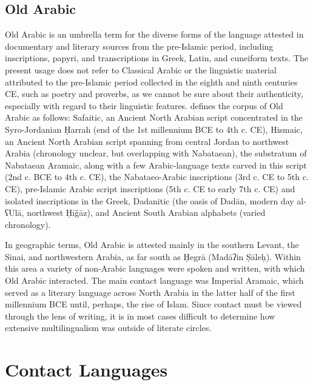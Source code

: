 \documentclass[output=paper]{langsci/langscibook}
\begin{document}
\subsection{Old Arabic}
Old Arabic is an umbrella term for the diverse forms of the language attested in documentary and literary sources from the pre-Islamic period, including inscriptions, papyri, and transcriptions in Greek, Latin, and cuneiform texts. The present usage does not refer to Classical Arabic or the linguistic material attributed to the pre-Islamic period collected in the eighth and ninth centuries CE, such as poetry and proverbs, as we cannot be sure about their authenticity, especially with regard to their linguistic features. \citet{Al-Jallad2017early} defines the corpus of Old Arabic as follows: Safaitic, an Ancient North Arabian script concentrated in the Syro-Jordanian Ḥarrah (end of the 1st millennium BCE to 4th c. CE), Hismaic, an Ancient North Arabian script spanning from central Jordan to northwest Arabia (chronology unclear, but overlapping with Nabataean), the substratum of Nabataean Aramaic, along with a few Arabic-language texts carved in this script (2nd c. BCE to 4th c. CE), the Nabataeo-Arabic inscriptions (3rd c. CE to 5th c. CE), pre-Islamic Arabic script inscriptions (5th c. CE to early 7th c. CE) and isolated inscriptions in the Greek, Dadanitic (the oasis of Dadān, modern day al-ʕUlā, northwest Ḥiǧāz), and Ancient South Arabian alphabets (varied chronology). 

In geographic terms, Old Arabic is attested mainly in the southern Levant, the Sinai, and northwestern Arabia, as far south as Ḥegrā (Madāʔin Ṣāleḥ). Within this area a variety of non-Arabic languages were spoken and written, with which Old Arabic interacted. The main contact language was Imperial Aramaic, which served as a literary language across North Arabia in the latter half of the first millennium BCE until, perhaps, the rise of Islam. Since contact must be viewed through the lens of writing, it is in most cases difficult to determine how extensive multilingualism was outside of literate circles.

\section{Contact Languages}
\end{document}

